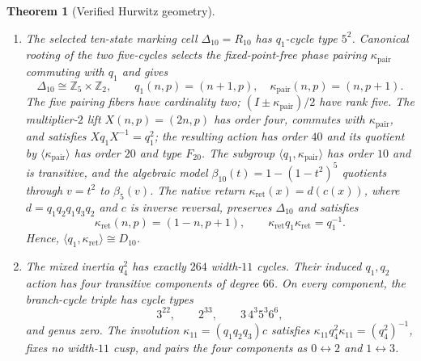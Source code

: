 \documentclass[11pt]{article}
\newtheorem{theorem}{Theorem}[section]
\theoremstyle{remark}
\newcommand{\Q}{\mathbb Q}
\newcommand{\Spec}{\operatorname{Spec}}
\begin{document}
\begin{theorem}[Verified Hurwitz geometry]
\begin{enumerate}[label=\textnormal{(\roman*)},leftmargin=2.4em]
\[
 \Spec\Q\ \sqcup\ \Spec\Q(\zeta_5).
\]
Inversion fixes exactly the rational summand, whose primitive central projector has trace one.  On the complementary factor $\Q(\zeta_5)$, inversion has fixed field $\Q(\sqrt5)$ and defines a quadratic extension $\Q(\zeta_5)/\Q(\sqrt5)$.  After base change to $\Q(\sqrt5)$, the invariant algebra is the trivalent algebra $N^3=N$, with the fixed projector $e_0$ and the two Galois-exchanged projectors $e_\pm$.
\item The selected ten-state marking cell $\Delta_{10}=R_{10}$ has $q_1$-cycle type $5^2$.  Canonical rooting of the two five-cycles selects the fixed-point-free phase pairing $\kappa_{\mathrm{pair}}$ commuting with $q_1$ and gives
\[
 \Delta_{10}\cong\mathbb Z_5\times\mathbb Z_2,
 \qquad q_1(n,p)=(n+1,p),\quad
 \kappa_{\mathrm{pair}}(n,p)=(n,p+1).
\]
The five pairing fibers have cardinality two; $(I\pm\kappa_{\mathrm{pair}})/2$ have rank five.  The multiplier-$2$ lift $X(n,p)=(2n,p)$ has order four, commutes with $\kappa_{\mathrm{pair}}$, and satisfies $Xq_1X^{-1}=q_1^2$; the resulting action has order $40$ and its quotient by $\langle\kappa_{\mathrm{pair}}\rangle$ has order $20$ and type $F_{20}$.  The subgroup $\langle q_1,\kappa_{\mathrm{pair}}\rangle$ has order $10$ and is transitive, and the algebraic model $\beta_{10}(t)=1-(1-t^2)^5$ quotients through $v=t^2$ to $\beta_5(v)$.  The native return $\kappa_{\mathrm{ret}}(x)=d(c(x))$, where $d=q_1q_2q_1q_3q_2$ and $c$ is inverse reversal, preserves $\Delta_{10}$ and satisfies
\[
 \kappa_{\mathrm{ret}}(n,p)=(1-n,p+1),
 \qquad
 \kappa_{\mathrm{ret}}q_1\kappa_{\mathrm{ret}}=q_1^{-1}.
\]
Hence, $\langle q_1,\kappa_{\mathrm{ret}}\rangle\cong D_{10}$.
\item The mixed inertia $q_4^2$ has exactly $264$ width-$11$ cycles.  Their induced $q_1,q_2$ action has four transitive components of degree $66$.  On every component, the branch-cycle triple has cycle types
\[
 3^{22},\qquad 2^{33},\qquad 3\,4^3 5^3 6^6,
\]
and genus zero.  The involution $\kappa_{11}=(q_1q_2q_3)c$ satisfies $\kappa_{11}q_4^2\kappa_{11}=(q_4^2)^{-1}$, fixes no width-$11$ cusp, and pairs the four components as $0\leftrightarrow2$ and $1\leftrightarrow3$.
\end{enumerate}
\end{theorem}
\end{document}
